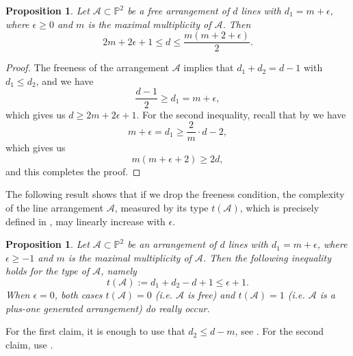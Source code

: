 \documentclass[12pt]{amsart}
\theoremstyle{plain}
\newtheorem{prop}[subsection]{Proposition}
\theoremstyle{definition}
\numberwithin{equation}{section}
\newcommand{\A}{{\mathcal A}}
\begin{document}
\begin{prop}
\label{bound}
Let $\mathcal{A} \subset \mathbb{P}^{2}$ be a free arrangement of $d$ lines with $d_{1} = m+\epsilon$, where $\epsilon \geq 0$ and $m$ is the maximal multiplicity of $\A$. Then
$$2m + 2\epsilon + 1 \leq d \leq \frac{m(m+2+\epsilon)}{2}.$$
\end{prop}
\begin{proof}
The freeness of the arrangement $\mathcal{A}$ implies that $d_{1} + d_{2} =d-1$ with $d_{1}\leq d_{2}$, and we have
$$\frac{d-1}{2} \geq d_{1} = m+\epsilon,$$
which gives us $d\geq 2m + 2\epsilon +1$.
For the second inequality, recall that by \cite[Theorem 2.8]{Mich} we have
$$m+\epsilon= d_{1} \geq \frac{2}{m}\cdot d-2,$$
which gives us
$$m(m+\epsilon + 2)\geq 2d, $$
and this completes the proof.
\end{proof}

The following result shows that if we drop the freeness condition, the complexity of the line arrangement $\A$, measured by its type $t(\A)$, which is precisely defined in \cite{ADP}, may linearly increase with $\epsilon$.
\begin{prop}
\label{bound2}
Let $\mathcal{A} \subset \mathbb{P}^{2}$ be an arrangement of $d$ lines with $d_{1} = m+\epsilon$, where $\epsilon \geq -1$ and $m$ is the maximal multiplicity of $\A$. Then the following inequality holds for the type of $\mathcal{A}$, namely
$$t(\A):=d_1+d_2-d+1 \leq \epsilon +1.$$
When $\epsilon =0$, both cases $t(\A)=0$ (i.e. $\A$ is free) and $t(\A)=1$
(i.e. $\A$ is a plus-one generated arrangement) do really occur.
\end{prop}
\proof
For the first claim, it is enough to use that $d_2 \leq d-m$, see \cite{Mich}. For the second claim, use \cite[Theorem 1.12]{Der}.
\endproof
\end{document}
